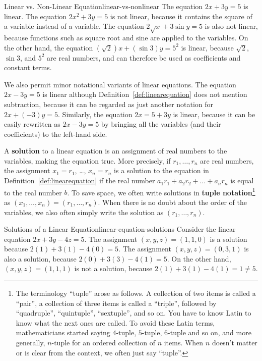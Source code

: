 \begin{example}{Linear vs. Non-Linear Equation}{linear-vs-nonlinear}
  The equation $2x+3y=5$ is linear. The equation $2x^2+3y=5$ is not
  linear, because it contains the square of a variable instead of a
  variable.  The equation $2\sqrt{x} + 3\sin y = 5$ is also not
  linear, because functions such as square root and sine are applied
  to the variables. On the other hand, the equation
  $(\sqrt{2}) x + (\sin 3)y = 5^2$ is linear, because $\sqrt{2}$,
  $\sin 3$, and $5^2$ are real numbers, and can therefore be used as
  coefficients and constant terms.

  We also permit minor notational variants of linear equations. The
  equation $2x-3y=5$ is linear although
  Definition~\ref{def:linearequation} does not mention subtraction,
  because it can be regarded as just another notation for
  $2x+(-3)y = 5$. Similarly, the equation $2x=5+3y$ is linear, because
  it can be easily rewritten as $2x-3y=5$ by bringing all the
  variables (and their coefficients) to the left-hand side.
\end{example}

A \textbf{solution} to a linear
equation is an assignment of real numbers to the variables, making the
equation true. More precisely, if $r_1,\ldots,r_n$ are real numbers,
the assignment $x_1=r_1$, \ldots, $x_n=r_n$ is a solution to the
equation in Definition~\ref{def:linearequation} if the real number
$a_1r_1 + a_2r_2 + \ldots + a_nr_n$ is equal to the real number
$b$. To save space, we often write solutions in \textbf{tuple
  notation}\footnote{The terminology ``tuple'' arose as
  follows. A collection of two items is called a ``pair'', a
  collection of three items is called a ``triple'', followed by
  ``quadruple'', ``quintuple'', ``sextuple'', and so on. You have to
  know Latin to know what the next ones are called. To avoid these
  Latin terms, mathematicians started saying $4$-tuple, $5$-tuple,
  $6$-tuple and so on, and more generally, $n$-tuple for an ordered
  collection of $n$ items. When $n$ doesn't matter or is clear from
  the context, we often just say ``tuple''.}  as
$(x_1,\ldots,x_n) = (r_1,\ldots,r_n)$. When there is no doubt about
the order of the variables, we also often simply write the solution as
$(r_1,\ldots,r_n)$.

\begin{example}{Solutions of a Linear Equation}{linear-equation-solutions}
  Consider the linear equation $2x+3y-4z=5$. The assignment
  $(x,y,z) = (1,1,0)$ is a solution because $2(1)+3(1)-4(0) = 5$. The
  assignment $(x,y,z) = (0,3,1)$ is also a solution, because $2(0) +
  3(3) - 4(1) = 5$. On the other hand, $(x,y,z) = (1,1,1)$ is not a
  solution, because $2(1) + 3(1)-4(1) = 1 \neq 5$.
\end{example}

